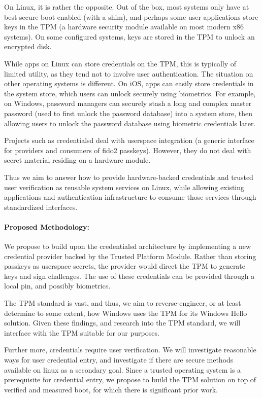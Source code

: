 \documentclass{article}
\begin{document}
On Linux, it is rather the opposite. Out of the box, most 
systems only have at best secure boot enabled (with a shim),
and perhaps some user applications store keys in the TPM (a 
hardware security module available on most modern x86 systems). On some
configured systems, keys are stored in the TPM to unlock an encrypted disk.

While apps on Linux can store credentials on the TPM, this is typically
of limited utility, as they tend not to involve user authentication.
The situation on other operating systems is different. On iOS, apps can
easily store credentials in the system store, which users can unlock securely
using biometrics. For example, on Windows, password managers can securely stash
a long and complex master password (used to first unlock the password database)
into a system store, then allowing users to unlock the password database using
biometric credentials later.

Projects such as credentialsd deal with userspace integration (a generic interface
for providers and consumers of fido2 passkeys). However, they do not deal with
secret material residing on a hardware module.

Thus we aim to answer how to provide hardware-backed credentials and trusted user verification
as reusable system services on Linux, while allowing existing applications and 
authentication infrastructure to consume those services through standardized interfaces.


\paragraph{Proposed Methodology:} 
We propose to build upon the credentialsd architecture by implementing a new credential
provider backed by the Trusted Platform Module. Rather than storing passkeys as userspace secrets,
the provider would direct the TPM to generate keys and sign challenges. The use of these
credentials can be provided through a local pin, and possibly biometrics.

The TPM standard is vast, and thus, we aim to reverse-engineer, or at least determine to some extent,
how Windows uses the TPM for its Windows Hello solution. Given these findings, and research into the TPM standard,
we will interface with the TPM suitable for our purposes.

Further more, credentials require user verification. We will investigate reasonable ways for user credential
entry, and investigate if there are secure methods available on linux as a secondary goal. Since a trusted operating
system is a prerequisite for credential entry, we propose to build the TPM solution on top of verified and measured boot, for which
there is significant prior work. 
\end{document}
